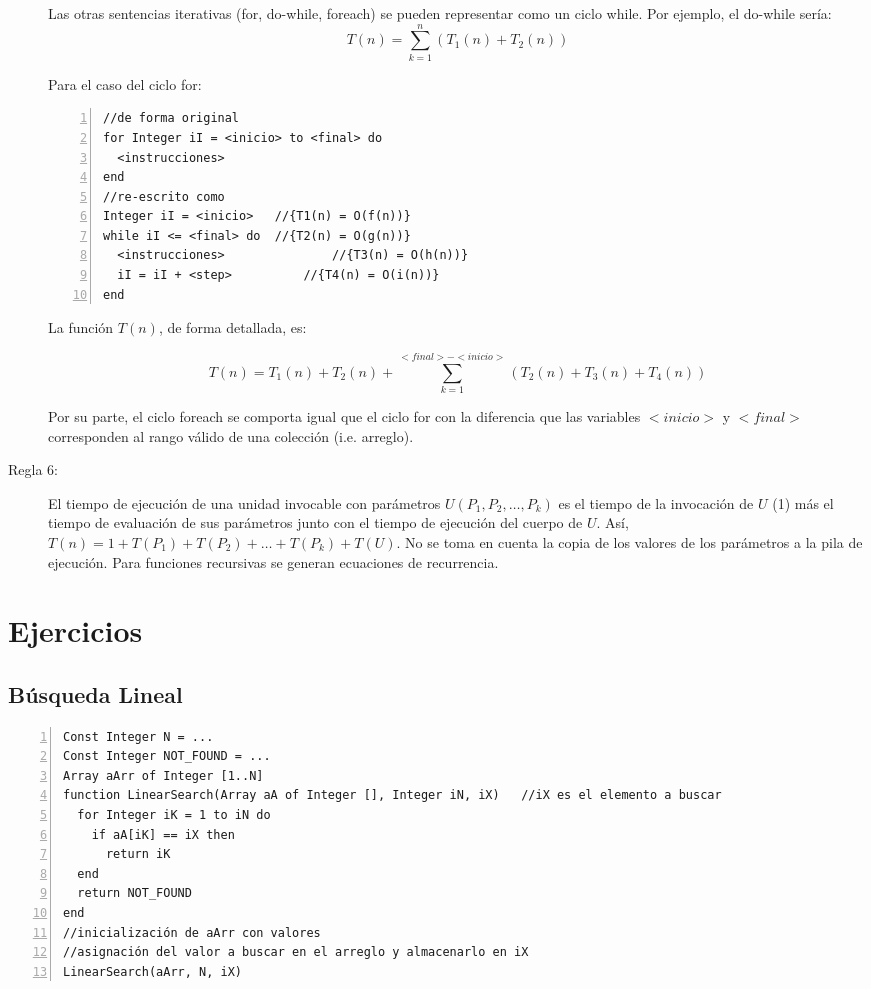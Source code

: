 \begin{description}
Las otras sentencias iterativas (for, do-while, foreach) se pueden representar como un ciclo while. Por ejemplo, el do-while sería:
$$T(n) = \sum_{k=1}^{n}{(T_1(n) + T_2(n))}$$

Para el caso del ciclo for:
\begin{lstlisting}[upquote=true, language=pseudo, numbers=left]
//de forma original
for Integer iI = <inicio> to <final> do
  <instrucciones>
end
//re-escrito como
Integer iI = <inicio>	//{T1(n) = O(f(n))}
while iI <= <final> do	//{T2(n) = O(g(n))}
  <instrucciones>				//{T3(n) = O(h(n))}
  iI = iI + <step>			//{T4(n) = O(i(n))}
end
\end{lstlisting}

La función $T(n)$, de forma detallada, es:

$$T(n) = T_1(n) + T_2(n) + \sum_{k=1}^{<final> - <inicio>}{(T_2(n) + T_3(n) + T_4(n))}$$

Por su parte, el ciclo foreach se comporta igual que el ciclo for con la diferencia que las variables $<inicio>$ y $<final>$ corresponden al rango válido de una colección (i.e. arreglo).

\item[Regla 6:] El tiempo de ejecución de una unidad invocable con parámetros $U(P_1, P_2, \dots, P_k)$ es el tiempo de la invocación de $U$ (1) más el tiempo de evaluación de sus parámetros junto con el tiempo de ejecución del cuerpo de $U$. Así, $T(n) = 1 + T(P_1) + T(P_2) + \dots + T(P_k) + T(U)$. No se toma en cuenta la copia de los valores de los parámetros a la pila de ejecución. Para funciones recursivas se generan ecuaciones de recurrencia.
\end{description}

\section{Ejercicios}

\subsection{Búsqueda Lineal}

\begin{lstlisting}[upquote=true, language=pseudo, numbers=left]
Const Integer N = ...
Const Integer NOT_FOUND = ...
Array aArr of Integer [1..N]
function LinearSearch(Array aA of Integer [], Integer iN, iX)	//iX es el elemento a buscar
  for Integer iK = 1 to iN do
    if aA[iK] == iX then
      return iK
  end
  return NOT_FOUND
end
//inicialización de aArr con valores
//asignación del valor a buscar en el arreglo y almacenarlo en iX
LinearSearch(aArr, N, iX)
\end{lstlisting}

